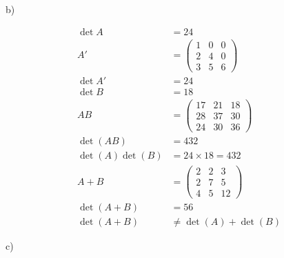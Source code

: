 \documentclass[letterpaper, 11pt]{article}
\newcommand{\1}{\mathds{1}}	%
\theoremstyle{definition}
\begin{document}
b)

\begin{align*}
    \det A            & = 24                     \\
    A'                & = \begin{pmatrix}
                              1 & 0 & 0 \\
                              2 & 4 & 0 \\
                              3 & 5 & 6
                          \end{pmatrix}         \\
    \det A'           & = 24                     \\
    \det B            & = 18                     \\
    AB                & = \begin{pmatrix}
                              17 & 21 & 18 \\
                              28 & 37 & 30 \\
                              24 & 30 & 36
                          \end{pmatrix}         \\
    \det (AB)         & = 432                    \\
    \det (A) \det (B) & = 24 \times 18 = 432     \\
    A + B             & =  \begin{pmatrix}
                               2 & 2 & 3  \\
                               2 & 7 & 5  \\
                               4 & 5 & 12
                           \end{pmatrix}        \\
    \det (A+B)        & = 56                     \\
    \det (A+B)        & \neq \det (A) + \det (B)
\end{align*}

c)
\end{document}
